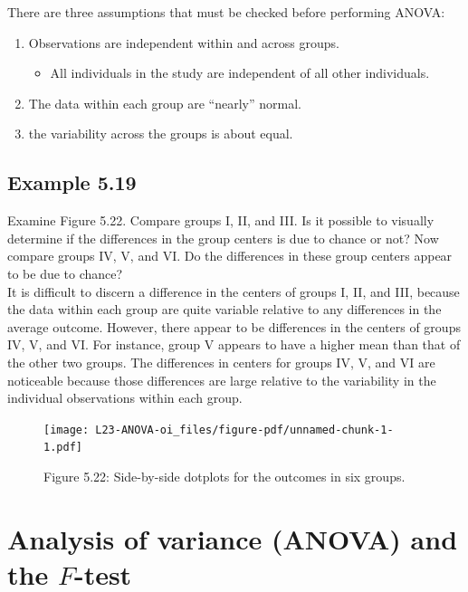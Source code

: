\documentclass[
  letterpaper,
  DIV=11,
  numbers=noendperiod,
  oneside]{scrreprt}
\providecommand{\tightlist}{%
  \setlength{\itemsep}{0pt}\setlength{\parskip}{0pt}}\usepackage{longtable,booktabs,array}
\begin{document}
There are three assumptions that must be checked before performing
ANOVA:

\begin{enumerate}
\def\labelenumi{\arabic{enumi}.}
\tightlist
\item
  Observations are independent within and across groups.

  \begin{itemize}
  \tightlist
  \item
    All individuals in the study are independent of all other
    individuals.
  \end{itemize}
\item
  The data within each group are ``nearly'' normal.
\item
  the variability across the groups is about equal.
\end{enumerate}

\hypertarget{example-5.19}{%
\subsection{Example 5.19}\label{example-5.19}}

Examine Figure 5.22. Compare groups I, II, and III. Is it possible to
visually determine if the differences in the group centers is due to
chance or not? Now compare groups IV, V, and VI. Do the differences in
these group centers appear to be due to chance?\\
It is difficult to discern a difference in the centers of groups I, II,
and III, because the data within each group are quite variable relative
to any differences in the average outcome. However, there appear to be
differences in the centers of groups IV, V, and VI. For instance, group
V appears to have a higher mean than that of the other two groups. The
differences in centers for groups IV, V, and VI are noticeable because
those differences are large relative to the variability in the
individual observations within each group.

\begin{figure}

{\centering \texttt{[image: L23-ANOVA-oi\_files/figure-pdf/unnamed-chunk-1-1.pdf]}

}

\caption{Figure 5.22: Side-by-side dotplots for the outcomes in six
groups.}

\end{figure}

\hypertarget{analysis-of-variance-anova-and-the-f-test}{%
\section{\texorpdfstring{Analysis of variance (ANOVA) and the
\(F\)-test}{Analysis of variance (ANOVA) and the F-test}}\label{analysis-of-variance-anova-and-the-f-test}}
\end{document}
